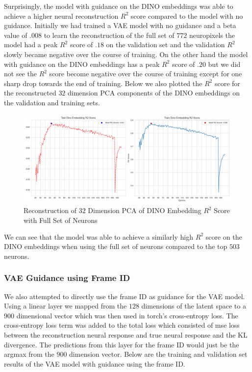 \documentclass[12pt, letterpaper]{article}
\begin{document}
Surprisingly, the model with guidance on the DINO \cite{dino} embeddings was able to achieve a higher neural reconstruction $R^2$ score compared to the model with no guidance. Initially we had trained a VAE model with no guidance and a beta value of $.008$ to learn the reconstruction of the full set of $772$ neuropixels the model had a peak $R^2$ score of $.18$ on the validation set and the validation $R^2$ slowly became negative over the course of training. On the other hand the model with guidance on the DINO \cite{dino} embeddings has a peak $R^2$ score of $.20$ but we did not see the $R^2$ score become negative over the course of training except for one sharp drop towards the end of training. Below we also plotted the $R^2$ score for the reconstructed $32$ dimension PCA components of the DINO \cite{dino} embeddings on the validation and training sets.

\begin{figure}[H]
    \centering
    \includegraphics[width=.9\textwidth]{.9_pca_DINO_embed_r2_128dim_772_top_var_200_epochs_0.008_beta_2_layer.png}
    \caption{Reconstruction of $32$ Dimension PCA of DINO Embedding $R^2$ Score with Full Set of Neurons}
    \label{fig:vae_guidance_DINO_pca_DINO_embed_r2_full_neurons}
\end{figure}

We can see that the model was able to achieve a similarly high $R^2$ score on the DINO \cite{dino} embeddings when using the full set of neurons compared to the top $503$ neurons. 

\subsubsection{VAE Guidance using Frame ID}
\label{subsubsec:vae_guidance_frame_id}
We also attempted to directly use the frame ID as guidance for the VAE model. Using a linear layer we mapped from the $128$ dimensions of the latent space to a $900$ dimensional vector which was then used in torch's cross-entropy loss. The cross-entropy loss term was added to the total loss which consisted of mse loss between the reconstruction neural response and true neural response and the KL divergence. The predictions from this layer for the frame ID would just be the argmax from the $900$ dimension vector. Below are the training and validation set results of the VAE model with guidance using the frame ID.
\end{document}
